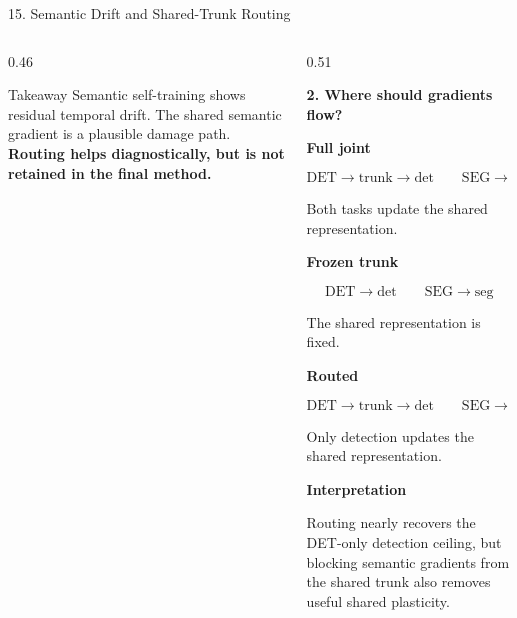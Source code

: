 \documentclass[aspectratio=169,11pt]{beamer}
\begin{document}
\begin{frame}{15. Semantic Drift and Shared-Trunk Routing}
\begin{columns}[T,onlytextwidth]
\begin{column}{0.46\textwidth}
\vspace{0.10cm}

\begin{block}{Takeaway}
\fontsize{5.7}{6.3}\selectfont
Semantic self-training shows residual temporal drift.
The shared semantic gradient is a plausible damage path.
\textbf{Routing helps diagnostically, but is not retained in the final method.}
\end{block}

\end{column}

\begin{column}{0.51\textwidth}

\textbf{2. Where should gradients flow?}

\vspace{0.06cm}

\textbf{Full joint}

\[
\mathrm{DET}\rightarrow\boxed{\mathrm{trunk}}\rightarrow\mathrm{det}
\qquad
\mathrm{SEG}\rightarrow\boxed{\mathrm{trunk}}\rightarrow\mathrm{seg}
\]

Both tasks update the shared representation.

\vspace{0.05cm}

\textbf{Frozen trunk}

\[
\mathrm{DET}\rightarrow\mathrm{det}
\qquad
\mathrm{SEG}\rightarrow\mathrm{seg}
\]

The shared representation is fixed.

\vspace{0.05cm}

\textbf{Routed}

\[
\mathrm{DET}\rightarrow\boxed{\mathrm{trunk}}\rightarrow\mathrm{det}
\qquad
\mathrm{SEG}\rightarrow\mathrm{seg}
\]

Only detection updates the shared representation.

\vspace{0.08cm}

\textbf{Interpretation}

Routing nearly recovers the DET-only detection ceiling,
but blocking semantic gradients from the shared trunk also removes useful
shared plasticity.

\end{column}

\end{columns}

\end{frame}
\end{document}
